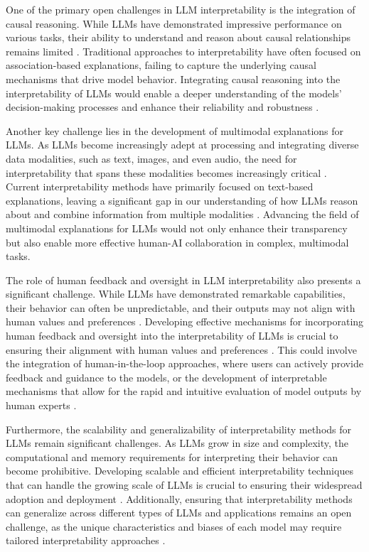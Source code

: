 \documentclass[11pt]{article}
\begin{document}
One of the primary open challenges in LLM interpretability is the integration of causal reasoning. While LLMs have demonstrated impressive performance on various tasks, their ability to understand and reason about causal relationships remains limited \cite{ref277,ref297}. Traditional approaches to interpretability have often focused on association-based explanations, failing to capture the underlying causal mechanisms that drive model behavior. Integrating causal reasoning into the interpretability of LLMs would enable a deeper understanding of the models' decision-making processes and enhance their reliability and robustness \cite{ref298}.

Another key challenge lies in the development of multimodal explanations for LLMs. As LLMs become increasingly adept at processing and integrating diverse data modalities, such as text, images, and even audio, the need for interpretability that spans these modalities becomes increasingly critical \cite{ref299}. Current interpretability methods have primarily focused on text-based explanations, leaving a significant gap in our understanding of how LLMs reason about and combine information from multiple modalities \cite{ref300}. Advancing the field of multimodal explanations for LLMs would not only enhance their transparency but also enable more effective human-AI collaboration in complex, multimodal tasks.

The role of human feedback and oversight in LLM interpretability also presents a significant challenge. While LLMs have demonstrated remarkable capabilities, their behavior can often be unpredictable, and their outputs may not align with human values and preferences \cite{ref178}. Developing effective mechanisms for incorporating human feedback and oversight into the interpretability of LLMs is crucial to ensuring their alignment with human values and preferences \cite{ref301}. This could involve the integration of human-in-the-loop approaches, where users can actively provide feedback and guidance to the models, or the development of interpretable mechanisms that allow for the rapid and intuitive evaluation of model outputs by human experts \cite{ref241}.

Furthermore, the scalability and generalizability of interpretability methods for LLMs remain significant challenges. As LLMs grow in size and complexity, the computational and memory requirements for interpreting their behavior can become prohibitive. Developing scalable and efficient interpretability techniques that can handle the growing scale of LLMs is crucial to ensuring their widespread adoption and deployment \cite{ref242}. Additionally, ensuring that interpretability methods can generalize across different types of LLMs and applications remains an open challenge, as the unique characteristics and biases of each model may require tailored interpretability approaches \cite{ref263}.
\end{document}
